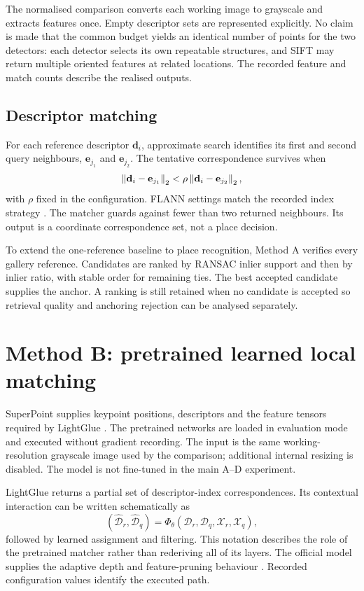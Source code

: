 The normalised comparison converts each working image to grayscale and extracts features once. Empty descriptor sets are represented explicitly. No claim is made that the common budget yields an identical number of points for the two detectors: each detector selects its own repeatable structures, and SIFT may return multiple oriented features at related locations. The recorded feature and match counts describe the realised outputs.

\subsection{Descriptor matching}
For each reference descriptor $\mathbf d_i$, approximate search identifies its first and second query neighbours, $\mathbf e_{j_1}$ and $\mathbf e_{j_2}$. The tentative correspondence survives when
\begin{equation}\label{eq:ratio}
 \left\lVert\mathbf d_i-\mathbf e_{j_1}\right\rVert_2 < \rho
 \left\lVert\mathbf d_i-\mathbf e_{j_2}\right\rVert_2,
\end{equation}
with $\rho$ fixed in the configuration. FLANN settings match the recorded index strategy \citep{muja2009}. The matcher guards against fewer than two returned neighbours. Its output is a coordinate correspondence set, not a place decision.

To extend the one-reference baseline to place recognition, Method A verifies every gallery reference. Candidates are ranked by RANSAC inlier support and then by inlier ratio, with stable order for remaining ties. The best accepted candidate supplies the anchor. A ranking is still retained when no candidate is accepted so retrieval quality and anchoring rejection can be analysed separately.

\section{Method B: pretrained learned local matching}
SuperPoint supplies keypoint positions, descriptors and the feature tensors required by LightGlue \citep{detone2018}. The pretrained networks are loaded in evaluation mode and executed without gradient recording. The input is the same working-resolution grayscale image used by the comparison; additional internal resizing is disabled. The model is not fine-tuned in the main A--D experiment.

LightGlue returns a partial set of descriptor-index correspondences. Its contextual interaction can be written schematically as
\begin{equation}
 (\widehat{\mathcal D}_r,\widehat{\mathcal D}_q)
 =\Phi_\theta(\mathcal D_r,\mathcal D_q,\mathcal X_r,\mathcal X_q),
\end{equation}
followed by learned assignment and filtering. This notation describes the role of the pretrained matcher rather than rederiving all of its layers. The official model supplies the adaptive depth and feature-pruning behaviour \citep{lindenberger2023}. Recorded configuration values identify the executed path.

